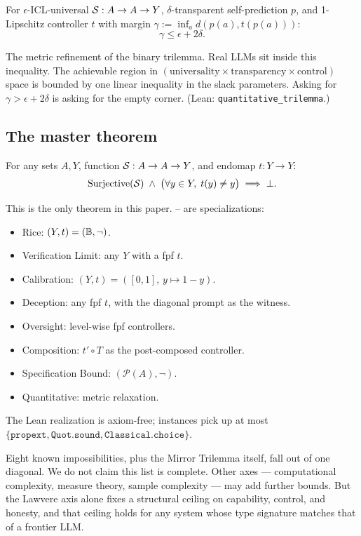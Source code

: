\begin{theorem}
\label{thm:quantitative}
For $\epsilon$-ICL-universal $\mathcal{S} : A \to A \to Y$, $\delta$-transparent self-prediction $p$, and 1-Lipschitz controller $t$ with margin $\gamma := \inf_a d(p(a), t(p(a)))$:
\begin{equation}
\gamma \le \epsilon + 2\delta.
\end{equation}
\end{theorem}

The metric refinement of the binary trilemma. Real LLMs sit inside this inequality. The achievable region in $(\text{universality} \times \text{transparency} \times \text{control})$ space is bounded by one linear inequality in the slack parameters. Asking for $\gamma > \epsilon + 2\delta$ is asking for the empty corner. (Lean: \texttt{quantitative\_trilemma}.)

\subsection{The master theorem}
\label{subsec:master}

\begin{theorem}
\label{thm:master}
For any sets $A, Y$, function $\mathcal{S} : A \to A \to Y$, and endomap $t : Y \to Y$:
\begin{equation}
\mathrm{Surjective}(\mathcal{S}) \;\wedge\; \bigl(\forall y \in Y,\; t(y) \neq y\bigr) \;\Longrightarrow\; \bot.
\end{equation}
\end{theorem}

This is the only theorem in this paper. -- are specializations:
\begin{itemize}\itemsep1pt
\item Rice: $(Y, t) = (\mathbb{B}, \neg)$.
\item Verification Limit: any $Y$ with a fpf $t$.
\item Calibration: $(Y, t) = ([0,1],\, y \mapsto 1-y)$.
\item Deception: any fpf $t$, with the diagonal prompt as the witness.
\item Oversight: level-wise fpf controllers.
\item Composition: $t' \circ T$ as the post-composed controller.
\item Specification Bound: $(\mathcal{P}(A), \neg)$.
\item Quantitative: metric relaxation.
\end{itemize}
The Lean realization is axiom-free; instances pick up at most $\{\texttt{propext}, \texttt{Quot.sound}, \texttt{Classical.choice}\}$.

\medskip
Eight known impossibilities, plus the Mirror Trilemma itself, fall out of one diagonal. We do not claim this list is complete. Other axes --- computational complexity, measure theory, sample complexity --- may add further bounds. But the Lawvere axis alone fixes a structural ceiling on capability, control, and honesty, and that ceiling holds for any system whose type signature matches that of a frontier LLM.
